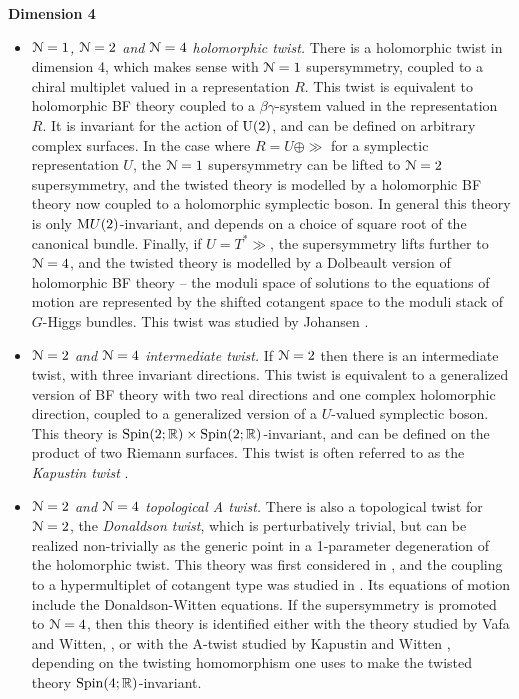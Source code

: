 \documentclass[10pt, oneside]{article}
\begin{document}
\textbf{Dimension 4}
\begin{itemize}
 \item \emph{$\mathcal{N}=1$, $\mathcal{N}=2$ and $\mathcal{N}=4$ holomorphic twist.} There is a holomorphic twist in dimension 4, which makes sense with $\mathcal{N}=1$ supersymmetry, coupled to a chiral multiplet valued in a representation $R$.  This twist is equivalent to holomorphic BF theory coupled to a $\beta \gamma$-system valued in the representation $R$.  It is invariant for the action of $\mathrm{U}(2)$, and can be defined on arbitrary complex surfaces.  In the case where $R = U \oplus \gg$ for a symplectic representation $U$, the $\mathcal{N}=1$ supersymmetry can be lifted to $\mathcal{N}=2$ supersymmetry, and the twisted theory is modelled by a holomorphic BF theory now coupled to a holomorphic symplectic boson.  In general this theory is only $\mathrm{M}U(2)$-invariant, and depends on a choice of square root of the canonical bundle.  Finally, if $U = T^*\gg$, the supersymmetry lifts further to $\mathcal{N}=4$, and the twisted theory is modelled by a Dolbeault version of holomorphic BF theory -- the moduli space of solutions to the equations of motion are represented by the shifted cotangent space to the moduli stack of $G$-Higgs bundles.  This twist was studied by Johansen \cite{Johansen}.
 \item \emph{$\mathcal{N}=2$ and $\mathcal{N}=4$ intermediate twist.}  If $\mathcal{N}=2$ then there is an intermediate twist, with three invariant directions.  This twist is equivalent to a generalized version of BF theory with two real directions and one complex holomorphic direction, coupled to a generalized version of a $U$-valued symplectic boson.  This theory is $\mathrm{Spin}(2;\mathbb R) \times \mathrm{Spin}(2;\mathbb R)$-invariant, and can be defined on the product of two Riemann surfaces.  This twist is often referred to as the \emph{Kapustin twist} \cite{KapustinHolo}.
 \item \emph{$\mathcal{N}=2$ and $\mathcal{N}=4$ topological A twist.} There is also a topological twist for $\mathcal{N}=2$, the \emph{Donaldson twist}, which is perturbatively trivial, but can be realized non-trivially as the generic point in a 1-parameter degeneration of the holomorphic twist.  This theory was first considered in \cite{WittenTQFT}, and the coupling to a hypermultiplet of cotangent type was studied in \cite{AlvarezLabastida, HyunParkPark}.  Its equations of motion include the Donaldson-Witten equations.  If the supersymmetry is promoted to $\mathcal{N}=4$, then this theory is identified either with the theory studied by Vafa and Witten, \cite{VafaWitten}, or with the A-twist studied by Kapustin and Witten \cite{KapustinWitten}, depending on the twisting homomorphism one uses to make the twisted theory $\mathrm{Spin}(4;\mathbb R)$-invariant.

\end{itemize}
\end{document}
